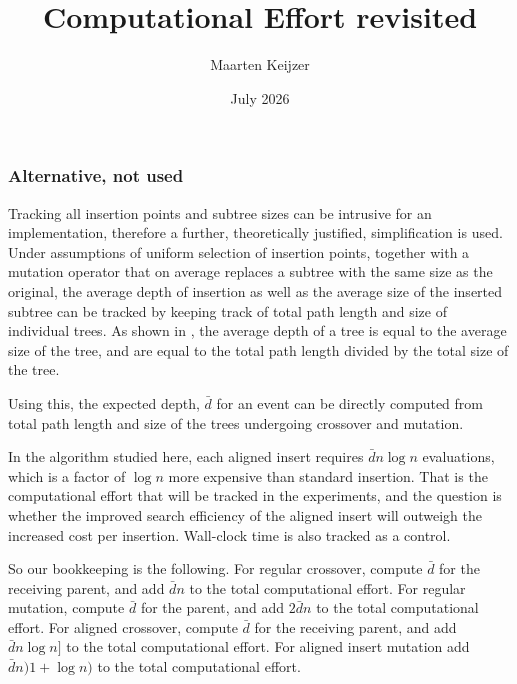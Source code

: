 \documentclass{article}
\title{Computational Effort revisited}
\author{Maarten Keijzer}
\date{July 2026}
\begin{document}
\maketitle

\begin{abstract}

\end{abstract}



\subsubsection{Alternative, not used}
Tracking all insertion points and subtree sizes can be intrusive for an implementation, therefore a further, theoretically justified, simplification is used. Under assumptions of uniform selection of insertion points, together with a mutation operator that on average replaces a subtree with the same size as the original, the average depth of insertion as well as the average size of the inserted subtree can be tracked by keeping track of total path length and size of individual trees. As shown in \cite{crossover-bias}, the average depth of a tree is equal to the average size of the tree, and are equal to the total path length divided by the total size of the tree. 

Using this, the expected depth, $\bar{d}$ for an event can be directly computed from total path length and size of the trees undergoing crossover and mutation.

In the algorithm studied here, each aligned insert requires $\bar{d} n \log n$ evaluations, which is a factor of $\log n$ more expensive than standard insertion. That is the computational effort that will be tracked in the experiments, and the question is whether the improved search efficiency of the aligned insert will outweigh the increased cost per insertion. Wall-clock time is also tracked as a control.

So our bookkeeping is the following. For regular crossover, compute $\bar{d}$ for the receiving parent, and add $\bar{d} n$ to the total computational effort. For regular mutation, compute $\bar{d}$ for the parent, and add $2 \bar{d} n$ to the total computational effort. For aligned crossover, compute $\bar{d}$ for the receiving parent, and add $\bar{d} n \log n]$ to the total computational effort. For aligned insert mutation add $\bar{d} n )1 + \log n)$ to the total computational effort. 
\end{document}
